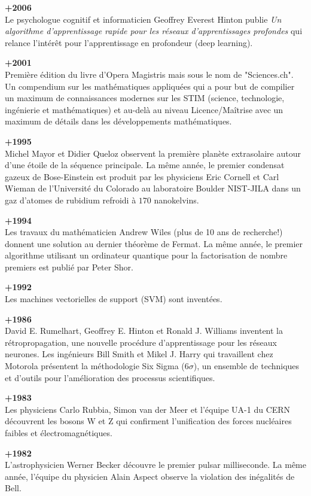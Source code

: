 \textbf{+2006}\\
Le psychologue cognitif et informaticien Geoffrey Everest Hinton publie \textit{Un algorithme d'apprentissage rapide pour les réseaux d'apprentissages profondes} qui relance l'intérêt pour l'apprentissage en profondeur (deep learning).

\textbf{+2001}\\
Première édition du livre d'Opera Magistris mais sous le nom de "Sciences.ch". Un compendium sur les mathématiques appliquées qui a pour but de compilier un maximum de connaissances modernes sur les STIM (science, technologie, ingénierie et mathématiques) et au-delà au niveau Licence/Maîtrise avec un maximum de détails dans les développements mathématiques.

\textbf{+1995}\\
Michel Mayor et Didier Queloz observent la première planète extrasolaire autour d'une étoile de la séquence principale. La même année, le premier condensat gazeux de Bose-Einstein est produit par les physiciens Eric Cornell et Carl Wieman de l'Université du Colorado au laboratoire Boulder NIST-JILA dans un gaz d'atomes de rubidium refroidi à $170$ nanokelvins.

\textbf{+1994}\\
Les travaux du mathématicien Andrew Wiles (plus de 10 ans de recherche!) donnent une solution au dernier théorème de Fermat. La même année, le premier algorithme utilisant un ordinateur quantique pour la factorisation de nombre premiers est publié par Peter Shor.

\textbf{+1992}\\
Les machines vectorielles de support (SVM) sont inventées.

\textbf{+1986}\\
David E. Rumelhart, Geoffrey E. Hinton et Ronald J. Williams inventent la rétropropagation, une nouvelle procédure d'apprentissage pour les réseaux neurones. Les ingénieurs Bill Smith et Mikel J. Harry qui travaillent chez Motorola présentent la méthodologie Six Sigma ($ 6\sigma $), un ensemble de techniques et d'outils pour l'amélioration des processus scientifiques.

\textbf{+1983}\\
Les physiciens Carlo Rubbia, Simon van der Meer et l'équipe UA-1 du CERN  découvrent les bosons W et Z qui confirment l'unification des forces nucléaires faibles et électromagnétiques.

\textbf{+1982}\\
L'astrophysicien Werner Becker découvre le premier pulsar milliseconde. La même année, l'équipe du physicien Alain Aspect observe la violation des inégalités de Bell.

